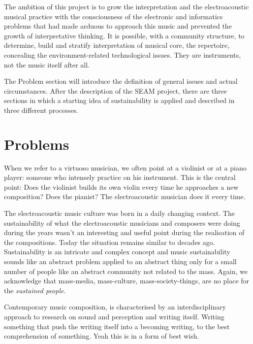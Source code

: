 \documentclass[twoside,a4paper]{article}
\begin{document}
The ambition of this project is to grow the interpretation and the electroacoustic musical practice with the consciousness of the electronic and informatics problems that had made arduous to approach this music and prevented the growth of interpretative thinking. It is possible, with a community structure, to determine, build and stratify interpretation of musical core, the repertoire, concealing the environment-related technological issues. They are instruments, not the music itself after all.

The Problem section will introduce the definition of general issues and actual circumstances. After the description of the SEAM project, there are three sections in which a starting idea of sustainability is applied and described in three different processes.


\section{Problems}
\label{sec:problems}

When we refer to a virtuoso musician, we often point at a violinist or at a piano player: someone who intensely practice on his instrument. This is the central point: Does the violinist builds its own violin every time he approaches a new composition? Does the pianist? The electroacoustic musician does it every time.

The electroacoustic music culture was born in a daily changing context. The sustainability of what the electroacoustic musicians and composers were doing during the years wasn't an interesting and useful point during the realisation of the compositions. Today the situation remains similar to decades ago. Sustainability is an intricate and complex concept and music sustainability sounds like an abstract problem applied to an abstract thing only for a small number of people like an abstract community not related to the mass. Again, we acknowledge that mass-media, mass-culture, mass-society-things, are no place for the \emph{sustained people}.

Contemporary music composition, is characterised by an interdisciplinary approach to research on sound and perception and writing itself. Writing something that push the writing itself into a becoming writing, to the best comprehension of something. Yeah this is in a form of best wish.
\end{document}
